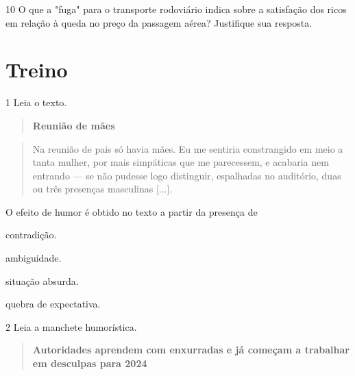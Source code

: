 \num{10} O que a "fuga" para o transporte rodoviário indica sobre a
satisfação dos ricos em relação à queda no preço da passagem aérea?
Justifique sua resposta.


\section{Treino}

\num{1} Leia o texto.

\begin{quote}
\centering\textbf{Reunião de mães}
\end{quote}


\begin{quote}
Na reunião de pais só havia mães. Eu me sentiria constrangido em meio a
tanta mulher, por mais simpáticas que me parecessem, e acabaria nem
entrando --- se não pudesse logo distinguir, espalhadas no auditório,
duas ou três presenças masculinas {[}...{]}.

\end{quote}

O efeito de humor é obtido no texto a partir da presença de

\begin{escolha}
\item contradição.

\item ambiguidade.

\item situação absurda.

\item quebra de expectativa.
\end{escolha}

\num{2} Leia a manchete humorística.

\begin{quote}
\textbf{Autoridades aprendem com enxurradas e já começam a trabalhar em
desculpas para 2024}

\end{quote}

